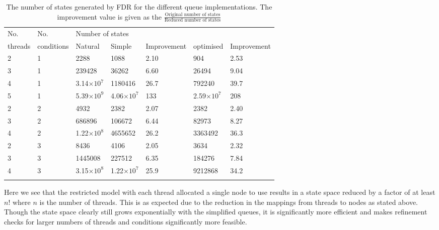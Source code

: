 \def\thickhline{\noalign{\hrule height 1.5pt}}

\begin{table}
  \renewcommand*{\arraystretch}{1.2}
  \caption{The number of states generated by FDR for the different queue implementations. The improvement value is given as the $\frac{\text{Original number of states}}{\text{Reduced number of states}}$}
    \begin{tabularx}{\linewidth}{|l|l|X|X|X|X|X|}
      \thickhline
      No.&No.& \multicolumn{5}{l|}{Number of states} \\
      threads&conditions& Natural & Simple & Improvement & optimised & Improvement\\
      \thickhline
      2 & 1 & 2288 & 1088 & 2.10& 904 & 2.53\\ \hline
      3 & 1 & 239428 & 36262 & 6.60& 26494 & 9.04 \\ \hline
      4 & 1 & 3.14$\times\text{10}^\text{7}$ & 1180416 & 26.7& 792240 & 39.7\\ \hline
      5 & 1 & 5.39$\times\text{10}^\text{9}$ & 4.06$\times\text{10}^\text{7}$ & 133& 2.59$\times\text{10}^\text{7}$ &208 \\
      \thickhline
      2 & 2 & 4932 & 2382 & 2.07& 2382 & 2.40\\ \hline
      3 & 2 & 686896 & 106672 & 6.44& 82973 & 8.27\\ \hline
      4 & 2 & 1.22$\times\text{10}^\text{8}$ & 4655652 & 26.2& 3363492 & 36.3\\ 
      \thickhline
      2 & 3 & 8436 & 4106 & 2.05& 3634 & 2.32\\ \hline
      3 & 3 & 1445008 & 227512 & 6.35 & 184276 & 7.84\\ \hline
      4 & 3 & 3.15$\times\text{10}^\text{8}$ & 1.22$\times\text{10}^\text{7}$ & 25.9& 9212868 & 34.2\\ 
      \thickhline
    \end{tabularx}
    \label{table:queue}
  \end{table}

  Here we see that the restricted model with each thread allocated a single node to use results in a state space reduced by a factor of at least $n!$ where $n$ is the number of threads. This is as expected due to the reduction in the mappings from threads to nodes as stated above. Though the state space clearly still grows exponentially with the simplified queues, it is significantly more efficient and makes refinement checks for larger numbers of threads and conditions significantly more feasible.
  
